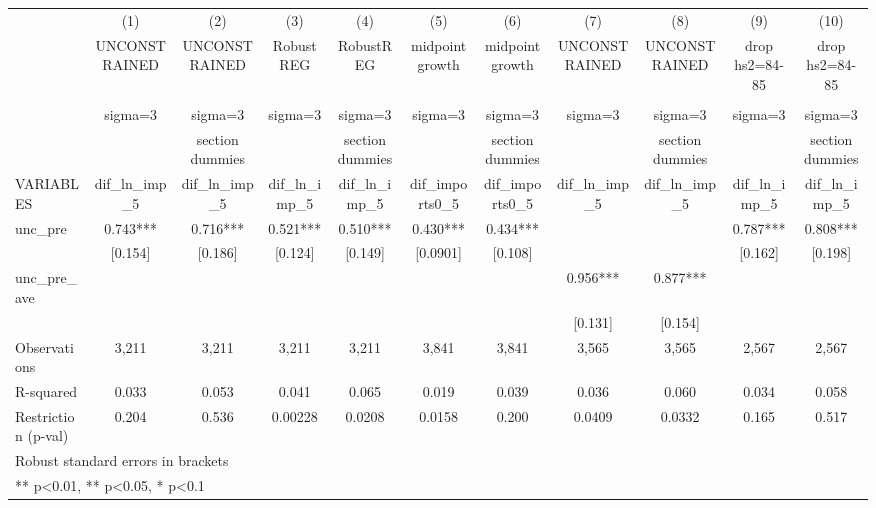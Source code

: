 \begin{adjustbox}{max width=\textwidth}
\begin{tabular}{lcccccccccc}
\toprule
 & (1) & (2) & (3) & (4) & (5) & (6) & (7) & (8) & (9) & (10) \\
 & UNCONSTRAINED & UNCONSTRAINED & RobustREG & RobustREG & midpoint growth & midpoint growth & UNCONSTRAINED & UNCONSTRAINED & drop hs2=84-85 & drop hs2=84-85 \\
 &  &  &  &  &  &  &  &  &  &  \\
 & sigma=3 & sigma=3 & sigma=3 & sigma=3 & sigma=3 & sigma=3 & sigma=3 & sigma=3 & sigma=3 & sigma=3 \\
 &  & section dummies &  & section dummies &  & section dummies &  & section dummies &  & section dummies \\
VARIABLES & dif\_ln\_imp\_5 & dif\_ln\_imp\_5 & dif\_ln\_imp\_5 & dif\_ln\_imp\_5 & dif\_imports0\_5 & dif\_imports0\_5 & dif\_ln\_imp\_5 & dif\_ln\_imp\_5 & dif\_ln\_imp\_5 & dif\_ln\_imp\_5 \\
\midrule
unc\_pre & 0.743*** & 0.716*** & 0.521*** & 0.510*** & 0.430*** & 0.434*** &  &  & 0.787*** & 0.808*** \\
 & [0.154] & [0.186] & [0.124] & [0.149] & [0.0901] & [0.108] &  &  & [0.162] & [0.198] \\
unc\_pre\_ave &  &  &  &  &  &  & 0.956*** & 0.877*** &  &  \\
 &  &  &  &  &  &  & [0.131] & [0.154] &  &  \\
\midrule
Observations & 3,211 & 3,211 & 3,211 & 3,211 & 3,841 & 3,841 & 3,565 & 3,565 & 2,567 & 2,567 \\
R-squared & 0.033 & 0.053 & 0.041 & 0.065 & 0.019 & 0.039 & 0.036 & 0.060 & 0.034 & 0.058 \\
Restriction (p-val) & 0.204 & 0.536 & 0.00228 & 0.0208 & 0.0158 & 0.200 & 0.0409 & 0.0332 & 0.165 & 0.517 \\
\bottomrule
\multicolumn{11}{l}{\footnotesize Robust standard errors in brackets} \\
\multicolumn{11}{l}{\footnotesize *** p<0.01, ** p<0.05, * p<0.1} \\
\end{tabular}
\end{adjustbox}
